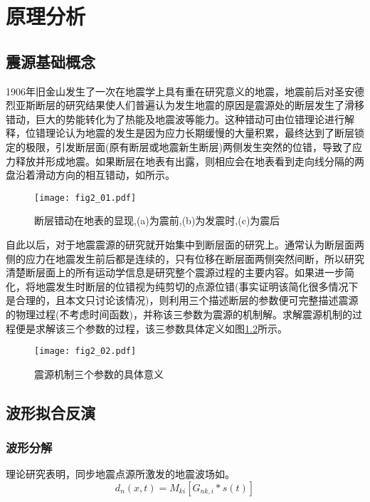 

\chapter{原理分析}

\section{震源基础概念}
1906年旧金山发生了一次在地震学上具有重在研究意义的地震，地震前后对圣安德烈亚斯断层的研究结果\citep{Milne1910}使人们普遍认为发生地震的原因是震源处的断层发生了滑移错动，巨大的势能转化为了热能及地震波等能力。这种错动可由位错理论进行解释，位错理论认为地震的发生是因为应力长期缓慢的大量积累，最终达到了断层锁定的极限，引发断层面(原有断层或地震新生断层)两侧发生突然的位错，导致了应力释放并形成地震。如果断层在地表有出露，则相应会在地表看到走向线分隔的两盘沿着滑动方向的相互错动，如所示。
\begin{figure}
\centering
  \texttt{[image: fig2\_01.pdf]} 
  \caption{断层错动在地表的显现,(a)为震前,(b)为发震时,(c)为震后\citep{Stein2003}}
  \label{fig2_01}
\end{figure}

自此以后，对于地震震源的研究就开始集中到断层面的研究上。通常认为断层面两侧的应力在地震发生前后都是连续的，只有位移在断层面两侧突然间断，所以研究清楚断层面上的所有运动学信息是研究整个震源过程的主要内容。如果进一步简化，将地震发生时断层的位错视为纯剪切的点源位错(事实证明该简化很多情况下是合理的，且本文只讨论该情况)，则利用三个描述断层的参数便可完整描述震源的物理过程(不考虑时间函数)，并称该三参数为震源的机制解。求解震源机制的过程便是求解该三个参数的过程，该三参数具体定义如图\ref{fig2_02}所示。
\begin{figure}
\centering
  \texttt{[image: fig2\_02.pdf]} 
  \caption{震源机制三个参数的具体意义}
  \label{fig2_02}
\end{figure}

\section{波形拟合反演}

\subsection{波形分解}
理论研究表明，同步地震点源\citep{Silver1982}所激发的地震波场如\citep{Jost1989}。
\begin{equation}
\label{eq2_01}
d_n(x,t)=M_{ki}[G_{nk,i}*s(t)]
\end{equation}


